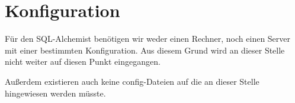 
\chapter{Konfiguration}
Für den SQL-Alchemist benötigen wir weder einen Rechner, noch einen Server mit einer bestimmten Konfiguration. Aus diesem Grund wird an dieser Stelle nicht weiter auf diesen Punkt eingegangen.

Außerdem existieren auch keine config-Dateien auf die an dieser Stelle hingewiesen werden müsste.